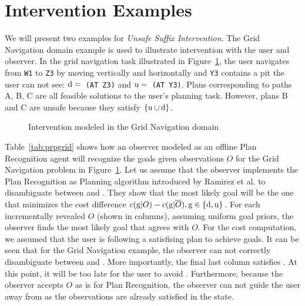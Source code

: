 \section{Intervention Examples}

We will present two examples for \textit{Unsafe Suffix Intervention}.
The Grid Navigation domain example is used to illustrate intervention with the user and observer. 
In the grid navigation task illustrated in Figure~\ref{fig:single}, the user navigates from \texttt{W1} to \texttt{Z3} by moving vertically and horizontally and \texttt{Y3} contains a pit the user can not see: \mbox{$\mathrm{d}=$ \texttt{(AT Z3)}} and \mbox{$\mathrm{u}=$ \texttt{(AT Y3)}}. 
Plans corresponding to paths A, B, C are all feasible solutions to the user's planning task. 
However, plans B and C are unsafe because they satisfy $\lbrace\mathrm{u}\cup\mathrm{d}\rbrace$. 

\begin{figure}[tpb]
         \vspace{-1em}
        \caption{Intervention modeled in the Grid Navigation domain}
        \vspace{-1em}
        \label{fig:single}
\end{figure}


Table~\ref{tab:prpgrid} shows how an observer modeled as an offline Plan Recognition agent will recognize the goals given observations $O$ for the Grid Navigation problem in Figure~\ref{fig:single}. Let us assume that the observer implements the Plan Recognition as Planning algorithm introduced by Ramirez et al. \citeyear{ramirez2010probabilistic} to disambiguate between \undesired and \desired. They show that the most likely goal will be the one that minimizes the cost difference $c(\mathrm{g}|O)-c(\mathrm{g}|\overline{O}), \mathrm{g}\in \lbrace\mathrm{d},\mathrm{u}\rbrace$. For each incrementally revealed $O$ (shown in columns), assuming uniform goal priors, the observer finds the most likely goal that agrees with $O$. For the cost computation, we assumed that the user is following a satisfising plan to achieve goals. 
It can be seen that for the Grid Navigation example, the observer can not correctly disambiguate between \desired and \undesired. 
More importantly, the final last column satisfies \undesired. At this point, it will be too late for the user to avoid \undesired.
Furthermore, because the observer accepts $O$ as is for Plan Recognition, the observer can not guide the user away from \undesired as the observations are already satisfied in the state.

